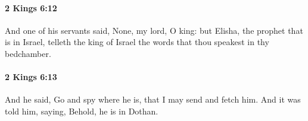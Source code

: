 		\paragraph{2 Kings 6:12} %
			\label{2KINGS-6-12}

			And one of his servants said, None, my lord, O king: but Elisha, the prophet that is in Israel, telleth the king of Israel the words that thou speakest in thy bedchamber.


		\paragraph{2 Kings 6:13} %
			\label{2KINGS-6-13}

			And he said, Go and spy where he is, that I may send and fetch him. And it was told him, saying, Behold, he is in Dothan.


